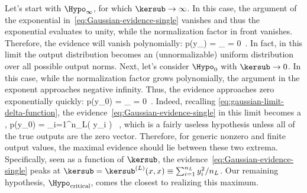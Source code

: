 Let's start with $\Hypo_\infty$, for which $\kersub\to\infty$. In this case, the argument of the exponential in~\eqref{eq:Gaussian-evidence-single} vanishes and thus the exponential evaluates to unity, while the normalization factor in front 
vanishes. Therefore, the evidence will vanish polynomially:%
\be\label{eq:exploding-kernel-evidence}
p(y\vert\Hypo_\infty) 
= \lim_{\kersub\to\infty}  = 0\, .
\ee
In fact, in this limit the output distribution becomes an (unnormalizable) uniform distribution over all possible output norms.
Next, let's consider $\Hypo_0$ with $\kersub\to0$. In this case, while the normalization factor grows polynomially, the argument in the exponent approaches negative infinity. Thus, the evidence approaches zero exponentially quickly:
\be
p(y\vert\Hypo_0) 
= \lim_{\kersub{}} \exp\!\le[ 
    -\frac{1}{2\kersub}\sum_{i=1}^{n_{L}}y_{i}^2 + \o{\log \kersub}
\ri]  = 0\, .
\ee
Indeed, recalling \eqref{eq:gaussian-limit-delta-function}, the evidence~\eqref{eq:Gaussian-evidence-single} in this limit becomes a ,
\be\label{eq:vanishing-kernel-evidence}
p(y\vert\Hypo_0) 
= \prod_{i=1}^{n_L}\delta\!\le( y_{i} \ri) \, ,
\ee
which is a fairly useless hypothesis unless all of the true outputs are the zero vector.
Therefore, for generic nonzero and finite output values, the maximal evidence should lie between these two extrema. 
Specifically, seen as a function of $\kersub$, the evidence~\eqref{eq:Gaussian-evidence-single} peaks at
$\kersub=\kersub^{(L)}(x,x)\equiv \sum_{i=1}^{n_{L}}y_{i}^2/n_{L}$.
Our remaining hypothesis,
 $\Hypo_{\text{critical}}$, comes the closest to realizing this maximum.



